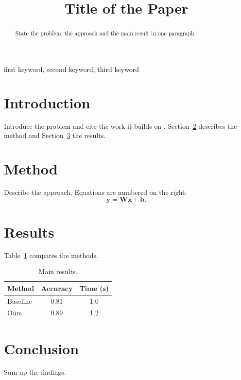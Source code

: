 \documentclass[conference]{IEEEtran}
\begin{document}
\title{Title of the Paper}

\author{
  \and
}

\maketitle

\begin{abstract}
State the problem, the approach and the main result in one paragraph.
\end{abstract}

\begin{IEEEkeywords}
first keyword, second keyword, third keyword
\end{IEEEkeywords}

\section{Introduction}
\label{sec:intro}
Introduce the problem and cite the work it builds on \cite{knuth1984texbook, lamport1994latex}. Section~\ref{sec:method}
describes the method and Section~\ref{sec:results} the results.

\section{Method}
\label{sec:method}
Describe the approach. Equations are numbered on the right:
\begin{equation}
  \mathbf{y} = \mathbf{W}\mathbf{x} + \mathbf{b} .
  \label{eq:linear}
\end{equation}

\section{Results}
\label{sec:results}
Table~\ref{tab:main} compares the methods.

\begin{table}[t]
  \centering
  \caption{Main results.}
  \label{tab:main}
  \begin{tabular}{lcc}
    \toprule
    Method & Accuracy & Time (s) \\
    \midrule
    Baseline & 0.81 & 1.0 \\
    Ours & 0.89 & 1.2 \\
    \bottomrule
  \end{tabular}
\end{table}

\section{Conclusion}
Sum up the findings.



\end{document}
